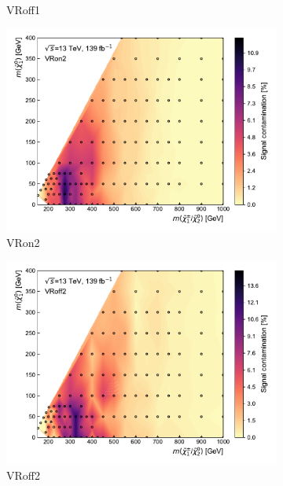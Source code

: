 \begin{figure}[H]
\begin{subfigure}[b]{0.5\linewidth}
		\caption{VRoff1\label{fig:signal_contamination_VRoff1}}
	\end{subfigure}\hfill
	\begin{subfigure}[b]{0.5\linewidth}
		\centering\includegraphics[width=1.0\textwidth]{signal_contamination/plot_VRon2}
		\caption{VRon2\label{fig:signal_contamination_VRon2}}
	\end{subfigure}\hfill
	\begin{subfigure}[b]{0.5\linewidth}
		\centering\includegraphics[width=1.0\textwidth]{signal_contamination/plot_VRoff2}
		\caption{VRoff2\label{fig:signal_contamination_VRoff2}}
	\end{subfigure}\hfill
	\begin{subfigure}[b]{0.5\linewidth}

\end{subfigure}
\end{figure}
